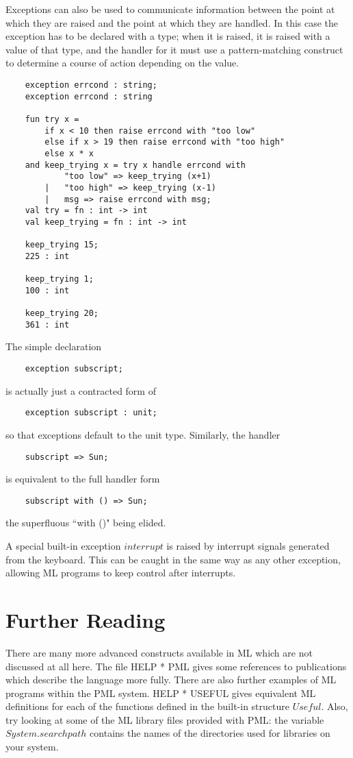 Exceptions can also be used to communicate information between the point
at which they are raised and the point at which they are handled. In
this case the exception has to be declared with a type; when it is
raised, it is raised with a value of that type, and the handler for it
must use a pattern-matching construct to determine a course of action
depending on the value.
\begin{verbatim}
    exception errcond : string;
    exception errcond : string

    fun try x =
        if x < 10 then raise errcond with "too low"
        else if x > 19 then raise errcond with "too high"
        else x * x
    and keep_trying x = try x handle errcond with
            "too low" => keep_trying (x+1)
        |   "too high" => keep_trying (x-1)
        |   msg => raise errcond with msg;
    val try = fn : int -> int
    val keep_trying = fn : int -> int

    keep_trying 15;
    225 : int

    keep_trying 1;
    100 : int

    keep_trying 20;
    361 : int
\end{verbatim}

The simple declaration
\begin{verbatim}
    exception subscript;
\end{verbatim}

is actually just a contracted form of
\begin{verbatim}
    exception subscript : unit;
\end{verbatim}

so that exceptions default to the unit type. Similarly, the handler
\begin{verbatim}
    subscript => Sun;
\end{verbatim}

is equivalent to the full handler form
\begin{verbatim}
    subscript with () => Sun;
\end{verbatim}

the superfluous ``with ()" being elided.

A special built-in exception $interrupt$ is raised by interrupt signals
generated from the keyboard. This can be caught in the same way as any
other exception, allowing ML programs to keep control after interrupts.

\section{Further Reading}

There are many more advanced constructs available in ML which are not
discussed at all here. The file HELP * PML gives some references to
publications which describe the language more fully. There are also
further examples of ML programs within the PML system. HELP * USEFUL
gives equivalent ML definitions for each of the functions defined in the
built-in structure $Useful$. Also, try looking at some of the ML library
files provided with PML: the variable $System.searchpath$ contains the
names of the directories used for libraries on your system.


